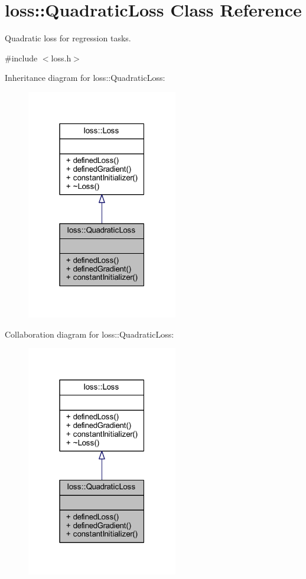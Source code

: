 \hypertarget{classloss_1_1_quadratic_loss}{}\section{loss\+:\+:Quadratic\+Loss Class Reference}
\label{classloss_1_1_quadratic_loss}


Quadratic loss for regression tasks.  




{\ttfamily \#include $<$loss.\+h$>$}



Inheritance diagram for loss\+:\+:Quadratic\+Loss\+:\nopagebreak
\begin{figure}[H]
\begin{center}
\leavevmode
\includegraphics[width=187pt]{classloss_1_1_quadratic_loss__inherit__graph}
\end{center}
\end{figure}


Collaboration diagram for loss\+:\+:Quadratic\+Loss\+:\nopagebreak
\begin{figure}[H]
\begin{center}
\leavevmode
\includegraphics[width=187pt]{classloss_1_1_quadratic_loss__coll__graph}
\end{center}
\end{figure}
